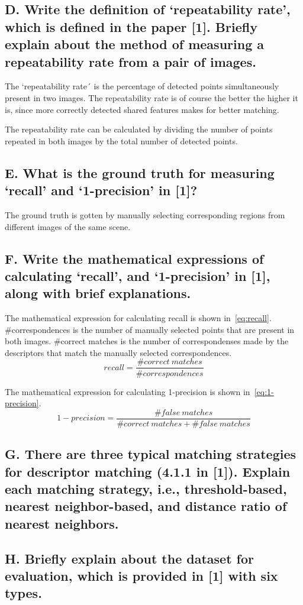 \subsection{D. Write the definition of ‘repeatability rate’, which is defined in
the paper [1]. Briefly explain about the method of measuring a repeatability
rate from a pair of images.}

The `repeatability rate´ is the percentage of detected points simultaneously
present in two images. The repeatability rate is of course the better the
higher it is, since more correctly detected shared features makes for better
matching.

The repeatability rate can be calculated by dividing the number of points
repeated in both images by the total number of detected points.

\subsection{E. What is the ground truth for measuring ‘recall’ and ‘1-precision’
in [1]?}


The ground truth is gotten by manually selecting corresponding regions from
different images of the same scene.

\subsection{F. Write the mathematical expressions of calculating ‘recall’, and
‘1-precision’ in [1], along with brief explanations.}

The mathematical expression for calculating recall is shown in~\ref{eq:recall}.
\#correspondences is the number of manually selected points that are
present in both images. \#correct matches is the number of correspondenses made
by the descriptors that match the manually selected correspondences.
\begin{equation}
  recall = \frac{\#correct\ matches}{\#correspondences}
  \label{eq:recall}
\end{equation}

The mathematical expression for calculating 1-precision is shown
in~\ref{eq:1-precision}. 
\begin{equation}
  1-precision = \frac{\#false\ matches}{\#correct\ matches + \#false\ matches}
  \label{eq:1-precision}
\end{equation}

\subsection{G. There are three typical matching strategies for descriptor
matching (4.1.1 in [1]). Explain each matching strategy, i.e., threshold-based,
nearest neighbor-based, and distance ratio of nearest neighbors.}

\subsection{H. Briefly explain about the dataset for evaluation, which is
provided in [1] with six types.}
